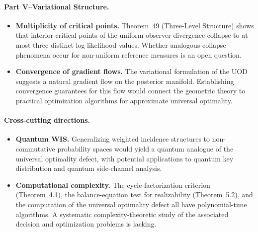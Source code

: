 \paragraph{Part V--Variational Structure.}
\begin{itemize}
\item \textbf{Multiplicity of critical points.}  Theorem~49 (Three-Level Structure) shows that interior critical points of the uniform observer divergence collapse to at most three distinct log-likelihood values.  Whether analogous collapse phenomena occur for non-uniform reference measures is an open question.
\item \textbf{Convergence of gradient flows.}  The variational formulation of the UOD suggests a natural gradient flow on the posterior manifold.  Establishing convergence guarantees for this flow would connect the geometric theory to practical optimization algorithms for approximate universal optimality.
\end{itemize}
\paragraph{Cross-cutting directions.}
\begin{itemize}
\item \textbf{Quantum WIS.}  Generalizing weighted incidence structures to non-commutative probability spaces would yield a quantum analogue of the universal optimality defect, with potential applications to quantum key distribution and quantum side-channel analysis.
\item \textbf{Computational complexity.}  The cycle-factorization criterion (Theorem~4.1), the balance-equation test for realizability (Theorem~5.2), and the computation of the universal optimality defect all have polynomial-time algorithms.  A systematic complexity-theoretic study of the associated decision and optimization problems is lacking.
\end{itemize}
\endinput
